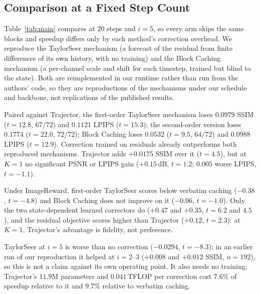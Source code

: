 \documentclass[conference,compsoc]{IEEEtran}
\newcommand{\ourmethod}{Trajector}
\begin{document}
\subsection{Comparison at a Fixed Step Count}

Table~\ref{tab:main} compares at $20$ steps and $i{=}5$, so every arm skips
the same blocks and speedup differs only by each method's correction overhead.
We reproduce the TaylorSeer mechanism \cite{liu2025taylorseer} (a forecast of the residual from finite differences of its own history, with no training)
and the Block Caching mechanism \cite{wimbauer2024blockcaching} (a per-channel scale and shift for each timestep, trained but blind to the state).
Both are reimplemented in our runtime rather than run from the authors' code,
so they are reproductions of the mechanisms under our schedule and backbone,
not replications of the published results.

\begin{table}[t]
\centering
\caption{Fixed $20$ steps, $i{=}5$, test prompts, $n{=}72$. ``Sp.'' is
median wall-clock speedup against the exact model in the same run, IR is
ImageReward \cite{xu2023imagereward}, $\Delta$SSIM is paired against verbatim
caching, and bold marks the best accelerated method.}
\label{tab:main}
\small
\setlength{\tabcolsep}{2.1pt}

\end{table}

Paired against \ourmethod{}, the first-order TaylorSeer mechanism loses
$0.0979$ SSIM ($t{=}12.8$, $67/72$) and $0.1121$ LPIPS ($t{=}15.3$); the
second-order version loses $0.1774$ ($t{=}22.0$, $72/72$); Block Caching loses
$0.0532$ ($t{=}9.5$, $64/72$) and $0.0988$ LPIPS ($t{=}12.9$). Correction
trained on residuals already outperforms both reproduced mechanisms.
\ourmethod{} adds $+0.0175$ SSIM over it ($t{=}4.5$), but at $K{=}1$ no
significant PSNR or LPIPS gain ($+0.15$\,dB, $t{=}1.2$; $0.005$ worse LPIPS, $t{=}{-}1.1$).

Under ImageReward, first-order TaylorSeer scores below verbatim caching
($-0.38$, $t{=}{-}4.8$) and Block Caching does not improve on it ($-0.06$,
$t{=}{-}1.0$). Only the two state-dependent learned correctors do ($+0.47$ and
$+0.35$, $t{=}6.2$ and $4.5$), and the residual objective scores higher than \ourmethod{} ($+0.12$, $t{=}2.3$): at $K{=}1$, \ourmethod{}'s advantage is fidelity, not
preference.

TaylorSeer at $i{=}5$ is worse than no correction ($-0.0294$, $t{=}{-}8.3$);
in an earlier run of our reproduction it helped at $i{=}2$--$3$ ($+0.008$ and
$+0.012$ SSIM, $n{=}192$), so this is not a claim against its own operating
point. It also needs no training; \ourmethod{}'s $11.9$M parameters and $0.041$\,TFLOP per correction cost $7.6\%$ of speedup relative to it and $9.7\%$ relative to verbatim caching.
\end{document}
